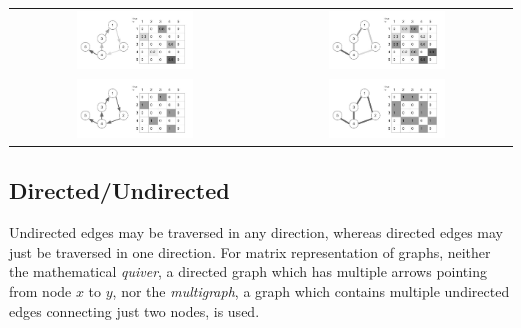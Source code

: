 \begin{table}[tp]
  \centering
\begin{tabu}{cc}
	\includegraphics[width=0.49\textwidth]{images/directed_weighted_graph}
	 &
	\includegraphics[width=0.49\textwidth]{images/undirected_weighted_graph} \\
	\includegraphics[width=0.49\textwidth]{images/directed_graph}  &
	\includegraphics[width=0.49\textwidth]{images/undirected_graph} 
\end{tabu}
\end{table}


\subsection{Directed/Undirected}

Undirected edges may be traversed in any direction, whereas directed edges may just be traversed in one direction. For matrix representation of graphs, neither the mathematical \textit{quiver}, a directed graph which has multiple arrows pointing from node $x$ to $y$, nor the \textit{multigraph}, a graph which contains multiple undirected edges connecting just two nodes, is used.


